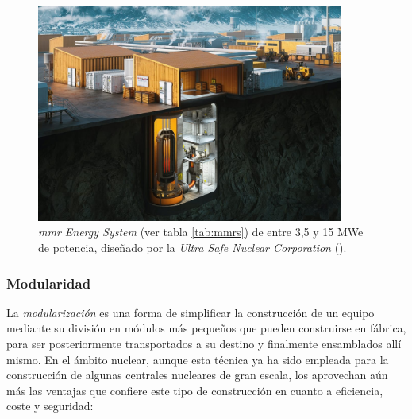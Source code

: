 \begin{figure}[h]
  \centering
  \includegraphics[width=0.9\textwidth]{content/figures/ultra_safe_nuclear_mmr.jpg}
  \caption{\emph{\acrshort{mmr} Energy System} (ver tabla \ref{tab:mmrs}) de entre 3,5 y 15 MWe de potencia, diseñado por la \emph{Ultra Safe Nuclear Corporation} (\cite{ultra_safe_nuclear_corporation}).}
  \label{fig:ultra_safe_nuclear_mmr}
\end{figure}

\subsubsection{Modularidad} \label{modularidad}

La \emph{modularización} es una forma de simplificar la construcción de un equipo mediante su división en módulos más pequeños que pueden construirse en fábrica, para ser posteriormente transportados a su destino y finalmente ensamblados allí mismo. En el ámbito nuclear, aunque esta técnica ya ha sido empleada para la construcción de algunas centrales nucleares de gran escala, los  aprovechan aún más las ventajas que confiere este tipo de construcción en cuanto a eficiencia, coste y seguridad:

